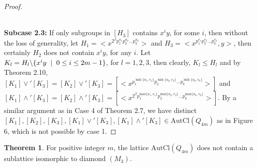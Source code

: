 \documentclass{article}
\theoremstyle{definition}
\newtheorem{theorem}{Theorem}[section]
\begin{document}
\begin{proof}
\begin{figure}[h!]
        \caption{}
\end{figure}\\
\textbf{Subcase 2.3:} If only subgroups in $[H_3]$ contains $x^iy$, for some $i$, then without the loss of generality, let $H_1=\bigl<x^{2^{\beta}p_1^{u_1}p_2^{u_2}\dots p_k^{u_k}}\bigr>$ and $H_3=\bigl<x^{p_1^{v_1}p_2^{v_2}\dots p_k^{v_k}},y\bigr>$, then certainly $H_2$ does not contain $x^iy$, for any $i$. Let $K_l=H_l \backslash \{x^iy\hspace{0.2cm}|\hspace{0.2cm} 0\le i\le 2m-1\} $, for $l=1,2,3$, then clearly, $K_l\le H_l$ and by Theorem 2.10, $[K_1]\vee' [K_3]=[K_2]\vee'[K_3]=[\bigl<x^{p_1^{\min\{u_1,v_1\}}p_2^{\min\{u_2,v_2\}}\dots p_k^{\min\{u_k,v_k\}}}\bigr>]$ and $[K_1]\wedge' [K_3]=[K_2]\wedge'[K_3]=[\bigl<x^{2^{\beta}p_1^{\text{max}\{u_1,v_1\}}p_2^{\text{max}\{u_2,v_2\}}\dots p_k^{\text{max}\{u_k,v_k\}}}\bigr>]$. By a similar argument as in Case 4 of Theorem 2.7, we have distinct $[K_1],[K_2],[K_3],[K_1]\vee'[K_3],[K_1]\wedge' [K_3]\in \text{AutCl}(Q_{4m})$ as in Figure 6, which is not possible by case 1.
    \end{proof}
    \begin{theorem}
        For positive integer $m$, the lattice $\text{AutCl}(Q_{4m})$ does not contain a sublattice isomorphic to diamond $(M_3)$.
    \end{theorem}
\end{document}
